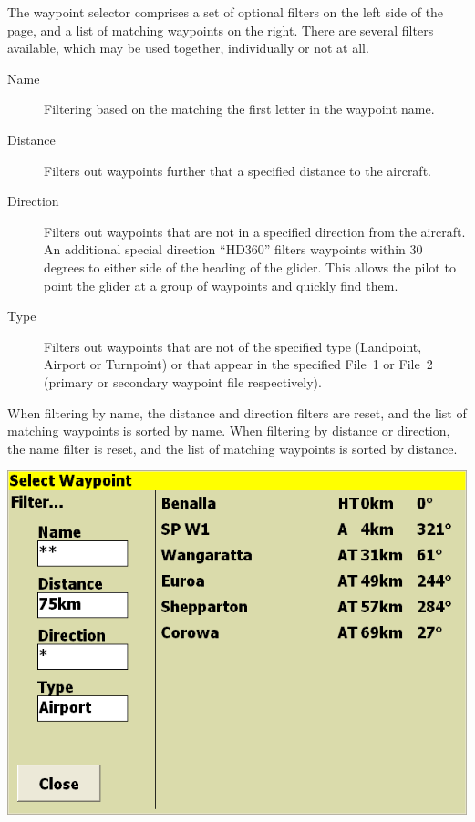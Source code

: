 \documentclass[a4paper,12pt]{refrep}
\begin{document}
The waypoint selector comprises a set of optional filters on the left
side of the page, and a list of matching waypoints on the right.
There are several filters available, which may be used together,
individually or not at all.
\begin{description}
\item[Name] Filtering based on the matching the first letter in the waypoint name. 
\item[Distance] Filters out waypoints further that a specified distance to the aircraft.
\item[Direction] Filters out waypoints that are not in a specified direction from the aircraft. 
   An additional special direction ``HD360'' filters waypoints within 30 degrees to either side of the 
   heading of the glider.  This allows the pilot to point the glider at a group of
  waypoints and quickly find them.
\item[Type] Filters out waypoints that are not of the specified type (Landpoint, Airport or Turnpoint) or
   that appear in the specified File~1 or File~2 (primary or secondary waypoint file respectively).
\end{description}
When filtering by name, the distance and direction filters are reset,
and the list of matching waypoints is sorted by name.  When filtering
by distance or direction, the name filter is reset, and the list
of matching waypoints is sorted by distance.

\begin{center}
\includegraphics[angle=0,width=\linewidth,keepaspectratio='true']{figures/dialog-waypointselect.png}
\end{center}
\end{document}
